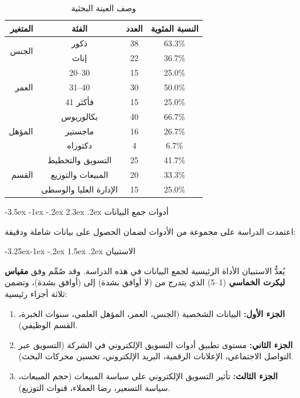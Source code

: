 \documentclass[12pt, a4paper]{report}
\makeatletter
\newcommand{\lr}[1]{\textenglish{#1}}
\renewcommand\section{\@startsection{section}{1}{\z@}%
  {-3.5ex \@plus -1ex \@minus -.2ex}%
  {2.3ex \@plus .2ex}%
  {\normalfont\Large\bfseries\color{primaryblue}}}
\renewcommand\subsection{\@startsection{subsection}{2}{\z@}%
  {-3.25ex\@plus -1ex \@minus -.2ex}%
  {1.5ex \@plus .2ex}%
  {\normalfont\large\bfseries\color{sectiongray}}}
\makeatother
\begin{document}
\begin{table}[h!]
\centering
\caption{وصف العينة البحثية}\label{tab:sample}
\begin{tabular}{|r|c|c|c|}
\hline
\rowcolor{tableheader}
\textbf{المتغير} & \textbf{الفئة} & \textbf{العدد} & \textbf{النسبة المئوية} \\
\hline
\multirow{2}{*}{الجنس} & ذكور & 38 & 63.3\% \\
\cline{2-4}
 & إناث & 22 & 36.7\% \\
\hline
\multirow{3}{*}{العمر} & 20--30 & 15 & 25.0\% \\
\cline{2-4}
 & 31--40 & 30 & 50.0\% \\
\cline{2-4}
 & 41 فأكثر & 15 & 25.0\% \\
\hline
\multirow{3}{*}{المؤهل} & بكالوريوس & 40 & 66.7\% \\
\cline{2-4}
 & ماجستير & 16 & 26.7\% \\
\cline{2-4}
 & دكتوراه & 4 & 6.7\% \\
\hline
\multirow{3}{*}{القسم} & التسويق والتخطيط & 25 & 41.7\% \\
\cline{2-4}
 & المبيعات والتوزيع & 20 & 33.3\% \\
\cline{2-4}
 & الإدارة العليا والوسطى & 15 & 25.0\% \\
\hline
\end{tabular}
\end{table}

\section{أدوات جمع البيانات}

اعتمدت الدراسة على مجموعة من الأدوات لضمان الحصول على بيانات شاملة ودقيقة:

\subsection{الاستبيان}

يُعدُّ الاستبيان الأداة الرئيسية لجمع البيانات في هذه الدراسة. وقد صُمِّم وفق \textbf{مقياس ليكرت الخماسي} \lr{(1--5)} الذي يتدرج من (لا أوافق بشدة) إلى (أوافق بشدة)، وتضمن ثلاثة أجزاء رئيسية:

\begin{enumerate}[label=\arabic*.]
  \item \textbf{الجزء الأول:} البيانات الشخصية (الجنس، العمر، المؤهل العلمي، سنوات الخبرة، القسم الوظيفي).
  \item \textbf{الجزء الثاني:} مستوى تطبيق أدوات التسويق الإلكتروني في الشركة (التسويق عبر التواصل الاجتماعي، الإعلانات الرقمية، البريد الإلكتروني، تحسين محركات البحث).
  \item \textbf{الجزء الثالث:} تأثير التسويق الإلكتروني على سياسة المبيعات (حجم المبيعات، سياسة التسعير، رضا العملاء، قنوات التوزيع).
\end{enumerate}
\end{document}
